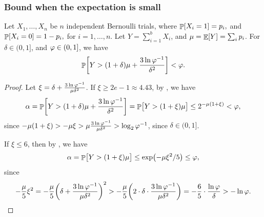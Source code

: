 
\subsubsection{Bound when the expectation is small}


\begin{lemma}
        Let $X_1, \ldots, X_n$ be $n$ independent Bernoulli trials, where
        \begin{math}
            \Prob{  X_i = 1 } =p_i,
        \end{math}
        and
        \begin{math}
            \Prob{  X_i = 0 } =1- p_i,
        \end{math}
        for $i=1,\ldots, n$.  Let $Y = \sum_{i=1}^{b} X_i$, and
        $\mu = \mathop{\mathbb{E}}\!\left[ { Y} \right] = \sum_i p_i$.  For $\delta \in (0,1]$, and
        $\varphi \in (0,1]$, we have
        \begin{equation*}
            \Prob{ \bigl. Y > (1+\delta)\mu + \frac{3\ln
                  \BadProb^{-1}}{\delta^2} }
            < \BadProb.
        \end{equation*}
\end{lemma}

\begin{proof}
    Let $\xi = \delta + \frac{3 \ln \varphi^{-1}}{\mu \delta^2}$.  If
    $\xi \geq 2e -1 \approx 4.43$, by , we
    have
    \begin{equation*}
        \alpha %
        =%
        \Prob{ \bigl. Y > (1+\delta)\mu + \frac{3\ln
              \BadProb^{-1}}{\delta^2} }%
        =%
        \Prob{ \bigl. Y > (1+\xi)\mu  }
        \leq%
        2^{-\mu ( 1+\xi)}
        <%
        \BadProb,
    \end{equation*}
    since
    $-\mu(1+\xi) > -\mu \xi > \mu \frac{3 \ln \varphi^{-1}}{\mu
       \delta^2} > \log_2 \varphi^{-1}$, since $\delta \in (0,1]$.

    If $\xi \leq 6$, then by , we have
    \begin{equation*}
        \alpha%
        =%
        \Prob{ \bigl. Y > (1+\xi)\mu  }%
        \leq%
        \exp\pth{ - \mu \xi^2  / 5 }
        \leq %
        \BadProb,
    \end{equation*}
    since
    \begin{equation*}
        - \frac{\mu}{5} \xi^2%
        =%
        - \frac{\mu}{5} \pth{  \delta + \frac{3 \ln \BadProb^{-1}}{\mu
              \delta^2} }^2%
        >%
        - \frac{\mu}{5} \pth{ 2 \cdot  \delta \cdot \frac{3 \ln \BadProb^{-1}}{\mu
              \delta^2} }%
        =%
        -\frac{6}{5} \cdot \frac{\ln \BadProb}{\delta} >
        -\ln \BadProb.
    \end{equation*}
\end{proof}

